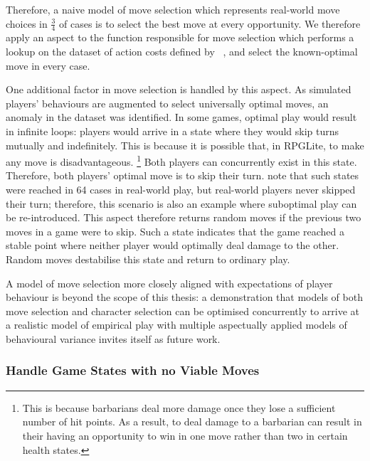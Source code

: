 Therefore, a naive model of move selection which represents real-world move
choices in \(\frac{3}{4}\) of cases is to select the best move at every
opportunity. We therefore apply an aspect to the function responsible for move
selection which performs a lookup on the dataset of action costs defined by
\citeauthor{kavanagh2021gameplay}~\cite{kavanagh2021gameplay}, and select the
known-optimal move in every case.

One additional factor in move selection is handled by this aspect. As simulated
players' behaviours are augmented to select universally optimal moves, an
anomaly in the dataset was identified. In some games, optimal play would result
in infinite loops: players would arrive in a state where they would skip turns
mutually and indefinitely. This is because it is possible that, in RPGLite, to
make any move is disadvantageous. \footnote{This is because barbarians deal more
damage once they lose a sufficient number of hit points. As a result, to deal
damage to a barbarian can result in their having an opportunity to win in one
move rather than two in certain health states.} Both players can concurrently
exist in this state. Therefore, both players' optimal move is to skip their
turn. \citeauthor{kavanagh2021gameplay} note that such states were reached in 64
cases in real-world play, but real-world players never skipped their turn;
therefore, this scenario is also an example where suboptimal play can be
re-introduced. This aspect therefore returns random moves if the previous two
moves in a game were to skip. Such a state indicates that the game reached a
stable point where neither player would optimally deal damage to the other.
Random moves destabilise this state and return to ordinary play.

A model of move selection more closely aligned with expectations of player
behaviour is beyond the scope of this thesis: a demonstration that models of
both move selection and character selection can be optimised concurrently to
arrive at a realistic model of empirical play with multiple aspectually applied
models of behavioural variance invites itself as future work.


\subsubsection{Handle Game States with no Viable Moves}


